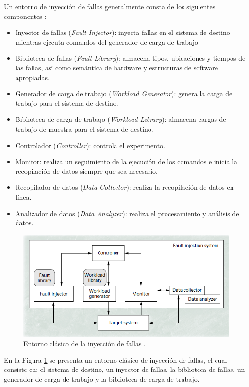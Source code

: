 \par Un entorno de inyección de fallas generalmente consta de los siguientes componentes \cite{LIB07}:
\begin{itemize}
    \item Inyector de fallas (\textit{Fault Injector}): inyecta fallas en el sistema de destino mientras ejecuta comandos del generador de carga de trabajo.
    \item Biblioteca de fallas (\textit{Fault Library}): almacena tipos, ubicaciones y tiempos de las fallas, asi como semántica de hardware y estructuras de software apropiadas.
    \item Generador de carga de trabajo (\textit{Workload Generator}): genera la carga de trabajo para el sistema de destino.
    \item Biblioteca de carga de trabajo (\textit{Workload Library}): almacena cargas de trabajo de muestra para el sistema de destino.
    \item Controlador (\textit{Controller}): controla el experimento.
    \item Monitor: realiza un seguimiento de la ejecución de los comandos e inicia la recopilación de datos siempre que sea necesario.
    \item Recopilador de datos (\textit{Data Collector}): realiza la recopilación de datos en línea.
    \item Analizador de datos (\textit{Data Analyzer}): realiza el procesamiento y análisis de datos.
\end{itemize}

\begin{figure}[htpb!]
	\centering
	\includegraphics[width=0.8\columnwidth]{images/fi01.PNG}
	\caption{Entorno clásico de la inyección de fallas \cite{LIB07}.}
	\label{fig:fi01}
\end{figure}

\par En la Figura \ref{fig:fi01} se presenta un entorno clásico de inyección de fallas, el cual consiste en: el sistema de destino, un inyector de fallas, la biblioteca de fallas, un generador de carga de trabajo y la biblioteca de carga de trabajo.

